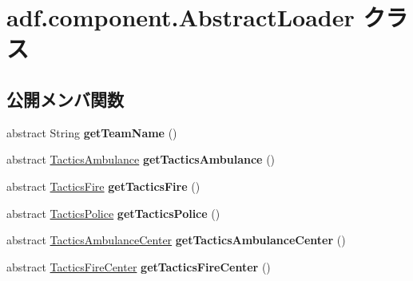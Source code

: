 \hypertarget{classadf_1_1component_1_1AbstractLoader}{}\section{adf.\+component.\+Abstract\+Loader クラス}
\label{classadf_1_1component_1_1AbstractLoader}
\subsection*{公開メンバ関数}
\begin{DoxyCompactItemize}
\item 
\hypertarget{classadf_1_1component_1_1AbstractLoader_a295d96c63465aa594b5b8a8137cbfd96}{}\label{classadf_1_1component_1_1AbstractLoader_a295d96c63465aa594b5b8a8137cbfd96} 
abstract String {\bfseries get\+Team\+Name} ()
\item 
\hypertarget{classadf_1_1component_1_1AbstractLoader_aa51ed4518181e2fb4ecc2ede1a37c095}{}\label{classadf_1_1component_1_1AbstractLoader_aa51ed4518181e2fb4ecc2ede1a37c095} 
abstract \hyperlink{classadf_1_1component_1_1tactics_1_1TacticsAmbulance}{Tactics\+Ambulance} {\bfseries get\+Tactics\+Ambulance} ()
\item 
\hypertarget{classadf_1_1component_1_1AbstractLoader_a65bd38d51297afe669f520a06a8370a5}{}\label{classadf_1_1component_1_1AbstractLoader_a65bd38d51297afe669f520a06a8370a5} 
abstract \hyperlink{classadf_1_1component_1_1tactics_1_1TacticsFire}{Tactics\+Fire} {\bfseries get\+Tactics\+Fire} ()
\item 
\hypertarget{classadf_1_1component_1_1AbstractLoader_a3d3610a866da0281a666f89ffff97e81}{}\label{classadf_1_1component_1_1AbstractLoader_a3d3610a866da0281a666f89ffff97e81} 
abstract \hyperlink{classadf_1_1component_1_1tactics_1_1TacticsPolice}{Tactics\+Police} {\bfseries get\+Tactics\+Police} ()
\item 
\hypertarget{classadf_1_1component_1_1AbstractLoader_a0afe21d2d55505b46df627f85502aa6b}{}\label{classadf_1_1component_1_1AbstractLoader_a0afe21d2d55505b46df627f85502aa6b} 
abstract \hyperlink{classadf_1_1component_1_1tactics_1_1center_1_1TacticsAmbulanceCenter}{Tactics\+Ambulance\+Center} {\bfseries get\+Tactics\+Ambulance\+Center} ()
\item 
\hypertarget{classadf_1_1component_1_1AbstractLoader_a32716db04b546a68b4ca8e4428d8c378}{}\label{classadf_1_1component_1_1AbstractLoader_a32716db04b546a68b4ca8e4428d8c378} 
abstract \hyperlink{classadf_1_1component_1_1tactics_1_1center_1_1TacticsFireCenter}{Tactics\+Fire\+Center} {\bfseries get\+Tactics\+Fire\+Center} ()

\end{DoxyCompactItemize}
